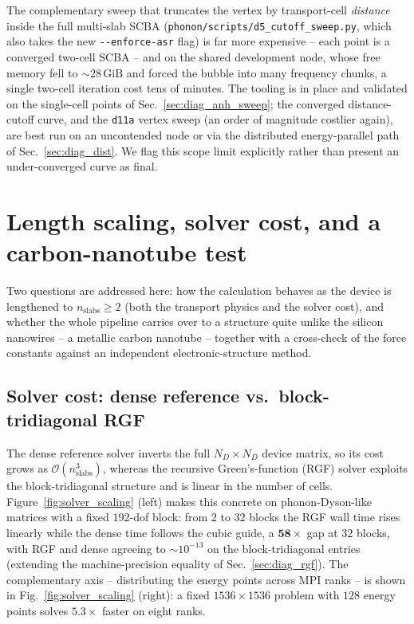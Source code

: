 The complementary sweep that truncates the vertex by transport-cell \emph{distance} inside
the full multi-slab SCBA (\texttt{phonon/scripts/d5\_cutoff\_sweep.py}, which also takes the
new \texttt{-{}-enforce-asr} flag) is far more expensive -- each point is a converged
two-cell SCBA -- and on the shared development node, whose free memory fell to
$\sim\!28\,\mathrm{GiB}$ and forced the bubble into many frequency chunks, a single two-cell
iteration cost tens of minutes. The tooling is in place and validated on the single-cell
points of Sec.~\ref{sec:diag_anh_sweep}; the converged distance-cutoff curve, and the
\texttt{d11a} vertex sweep (an order of magnitude costlier again), are best run on an
uncontended node or via the distributed energy-parallel path of
Sec.~\ref{sec:diag_dist}. We flag this scope limit explicitly rather than present an
under-converged curve as final.

\section{Length scaling, solver cost, and a carbon-nanotube test}
\label{sec:diag_scaling_cnt}

Two questions are addressed here: how the calculation behaves as the device is lengthened to
$n_\mathrm{slabs}\ge 2$ (both the transport physics and the solver cost), and whether the whole
pipeline carries over to a structure quite unlike the silicon nanowires -- a metallic carbon
nanotube -- together with a cross-check of the force constants against an independent
electronic-structure method.

\subsection{Solver cost: dense reference vs.\ block-tridiagonal RGF}
\label{sec:diag_rgf_scaling}

The dense reference solver inverts the full $N_D\times N_D$ device matrix, so its cost grows as
$\mathcal{O}(n_\mathrm{slabs}^3)$, whereas the recursive Green's-function (RGF) solver exploits
the block-tridiagonal structure and is linear in the number of cells. Figure~\ref{fig:solver_scaling}
(left) makes this concrete on phonon-Dyson-like matrices with a fixed $192$-dof block: from $2$ to
$32$ blocks the RGF wall time rises linearly while the dense time follows the cubic guide, a
$\mathbf{58\times}$ gap at $32$ blocks, with RGF and dense agreeing to $\sim\!10^{-13}$ on the
block-tridiagonal entries (extending the machine-precision equality of
Sec.~\ref{sec:diag_rgf}). The complementary axis -- distributing the energy points across MPI
ranks -- is shown in Fig.~\ref{fig:solver_scaling} (right): a fixed $1536\times1536$ problem with
$128$ energy points solves $\mathbf{5.3\times}$ faster on eight ranks.


